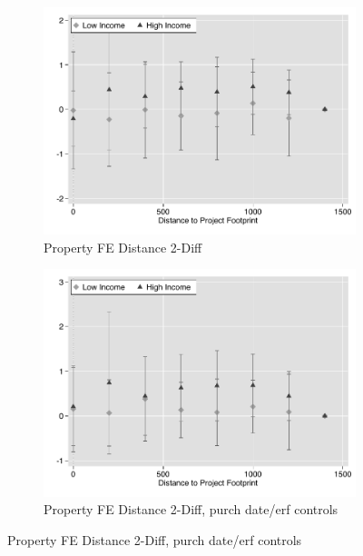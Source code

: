 \documentclass[12pt]{article}
\begin{document}
\begin{figure}
\begin{subfigure}[b]{0.48\textwidth}
        \end{subfigure}
        \begin{subfigure}[b]{0.48\textwidth}
                    \caption[Network2]%
            {{\footnotesize Property FE Distance 2-Diff}}    
            \label{fig:prefor}
            \centering
            \includegraphics[width=\textwidth,trim={0.3cm .3cm 0.1cm 0cm}, clip=true]{figures/price_dist_2d_no_ctrl_pfe}
        \end{subfigure}
        \hfill
        \begin{subfigure}[b]{0.48\textwidth}
                    \caption[Network2]%
            {{\footnotesize Property FE Distance 2-Diff, purch date/erf controls}}    
            \label{fig:prefor}
            \centering
            \includegraphics[width=\textwidth,trim={0.3cm .3cm 0.1cm 0cm}, clip=true]{figures/price_dist_2d_ctrl_pfe}
        \end{subfigure}
       
\end{figure}
\end{document}

